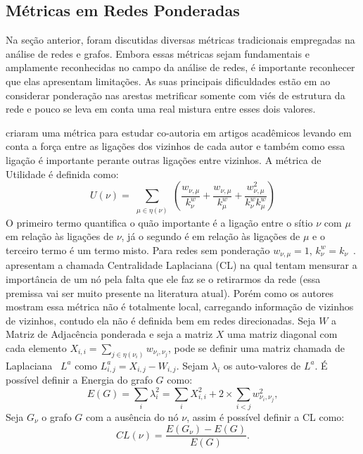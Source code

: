 \subsection{Métricas em Redes Ponderadas}

Na seção anterior, foram discutidas diversas métricas tradicionais empregadas na análise de redes e grafos. Embora essas métricas sejam fundamentais e amplamente reconhecidas no campo da análise de redes, é importante reconhecer que elas apresentam limitações. As suas principais dificuldades estão em ao considerar ponderação nas arestas metrificar somente com viés de estrutura da rede e pouco se leva em conta uma real mistura entre esses dois valores. 

 criaram uma métrica para estudar co-autoria em artigos acadêmicos levando em conta a força entre as ligações dos vizinhos de cada autor e também como essa ligação é importante perante outras ligações entre vizinhos. A 
métrica de Utilidade é definida como:
\begin{equation}
    U(\nu) = \sum_{\substack{\mu \in \eta(\nu)}} \left(\frac{w_{\nu,\mu}}{k^w_\nu}+ \frac{w_{\nu,\mu}}{k^w_\mu} + \frac{w_{\nu,\mu}^2}{k^w_\nu k^w_\mu}\right)
\end{equation}
O primeiro termo quantifica o quão importante é a ligação entre o sítio $\nu$ com $\mu$ em relação às ligações de $\nu$, já o segundo é em relação às ligações de $\mu$ e o terceiro termo é um termo misto. Para redes sem ponderação $w_{\nu,\mu} = 1$, $k_\nu^w = k_\nu$~\cite{Jackson1996}.
\cite{Qi2012} apresentam a chamada Centralidade Laplaciana (CL) na qual tentam mensurar a importância de um nó pela falta que ele faz se o retirarmos da rede (essa premissa vai ser muito presente na literatura atual). Porém como os autores mostram essa métrica não é totalmente local, carregando informação de vizinhos de vizinhos, contudo ela não é definida bem em redes direcionadas.
Seja $W$ a Matriz de Adjacência ponderada e seja a matriz $X$ uma matriz diagonal com cada elemento $X_{i,i} = \sum_{j \in \eta(\nu_i)}w_{\nu_i,\nu_j}$, pode se definir uma matriz chamada de Laplaciana~\cite{networks} $L^a$ como $L^a_{i,j} = X_{i,j} - W_{i,j}$. Sejam
${\lambda_{i}}$ os auto-valores de $L^a$. É possível definir a Energia do grafo $G$ como:
\begin{equation}
    E(G) = \sum_{i} \lambda_{i}^2 = \sum_{i}X_{i,i}^2 + 2\times\sum_{i < j}w_{\nu_i,\nu_j}^2,
\end{equation}
Seja $G_\nu$ o grafo $G$ com a ausência do nó $\nu$, assim é possível definir a CL como:
\begin{equation}
    CL(\nu) = \frac{E(G_\nu) - E(G)}{E(G)}.
\end{equation}

